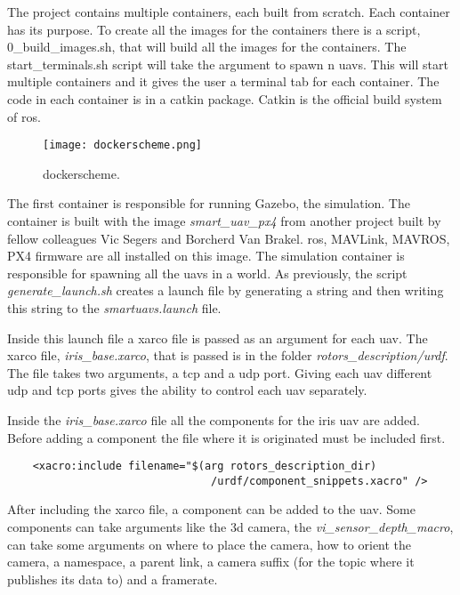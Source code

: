 
The project contains multiple containers, each built from scratch. Each container has its purpose. 
To create all the images for the containers there is a script, 0\_build\_images.sh, that will build 
all the images for the containers. 
The start\_terminals.sh script will take the argument to spawn n \acp{uav}. 
This will start multiple containers and it gives the user a terminal tab for each container. 
The code in each container is in a catkin package. Catkin is the official build system of \acs{ros}. 

\begin{figure}[ht]
    \centering
    \texttt{[image: dockerscheme.png]}
    \caption[dockerscheme]{dockerscheme\footnotemark.}
\end{figure}

The first container is responsible for running Gazebo, the simulation. 
The container is built with the image \textit{smart\_uav\_px4} 
from another project built by fellow colleagues Vic Segers and Borcherd Van Brakel. \acs{ros}, MAVLink, 
MAVROS, PX4 firmware are all installed on this image. 
The simulation container is responsible for spawning all the \acp{uav} in a world. As previously, 
the script \textit{generate\_launch.sh} creates a launch file 
by generating a string and then writing this string to the \textit{smartuavs.launch} file. 

Inside this launch file a xarco file is passed as an argument for each \acs{uav}. 
The xarco file, \textit{iris\_base.xarco}, that is passed is in the folder \textit{rotors\_description/urdf}. 
The file takes two arguments, a \acs{tcp} and a \acs{udp} port. Giving each \acs{uav} different \acs{udp} and 
\acs{tcp} ports gives the ability to control each \acs{uav} separately. 

Inside the \textit{iris\_base.xarco} file all the components for the iris \acs{uav} are added. 
Before adding a component the file where it is originated must be included first. 


\begin{verbatim}
    <xacro:include filename="$(arg rotors_description_dir)
                                /urdf/component_snippets.xacro" />

\end{verbatim}

After including the xarco file, a component can be added to the \acs{uav}. 
Some components can take arguments like the \acs{3d} camera, the \textit{vi\_sensor\_depth\_macro}, 
can take some arguments on where to place the camera, how to orient the camera, 
a namespace, a parent link, a camera suffix (for the topic where it publishes its data to) and a framerate. 

